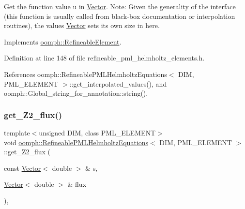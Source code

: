 Get the function value u in \hyperlink{classoomph_1_1Vector}{Vector}. Note\+: Given the generality of the interface (this function is usually called from black-\/box documentation or interpolation routines), the values \hyperlink{classoomph_1_1Vector}{Vector} sets its own size in here. 



Implements \hyperlink{classoomph_1_1RefineableElement_ada6f0efe831ffefb1d2829ce01d45bfc}{oomph\+::\+Refineable\+Element}.



Definition at line 148 of file refineable\+\_\+pml\+\_\+helmholtz\+\_\+elements.\+h.



References oomph\+::\+Refineable\+P\+M\+L\+Helmholtz\+Equations$<$ D\+I\+M, P\+M\+L\+\_\+\+E\+L\+E\+M\+E\+N\+T $>$\+::get\+\_\+interpolated\+\_\+values(), and oomph\+::\+Global\+\_\+string\+\_\+for\+\_\+annotation\+::string().

\mbox{\label{classoomph_1_1RefineablePMLHelmholtzEquations_ad51cfaf01ba8ca49842796d3f906877c}} 
\subsubsection{\texorpdfstring{get\+\_\+\+Z2\+\_\+flux()}{get\_Z2\_flux()}}
{\footnotesize\ttfamily template$<$unsigned D\+IM, class P\+M\+L\+\_\+\+E\+L\+E\+M\+E\+NT$>$ \\
void \hyperlink{classoomph_1_1RefineablePMLHelmholtzEquations}{oomph\+::\+Refineable\+P\+M\+L\+Helmholtz\+Equations}$<$ D\+IM, P\+M\+L\+\_\+\+E\+L\+E\+M\+E\+NT $>$\+::get\+\_\+\+Z2\+\_\+flux (\begin{DoxyParamCaption}\item[{const \hyperlink{classoomph_1_1Vector}{Vector}$<$ double $>$ \&}]{s,  }\item[{\hyperlink{classoomph_1_1Vector}{Vector}$<$ double $>$ \&}]{flux }\end{DoxyParamCaption})\hspace{0.3cm}{\ttfamily [inline]}, {\ttfamily [virtual]}}



